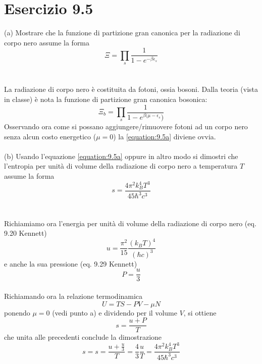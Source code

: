 \documentclass[a4paper]{article}
\begin{document}
    \section*{Esercizio 9.5}
        (a) Mostrare che la funzione di partizione gran canonica per la radiazione di corpo nero assume la forma
        \begin{equation}
            \Xi=\prod_s\frac{1}{1-e^{-\beta\epsilon_s}}
            \label{equation:9.5a}
        \end{equation}
        \\
        \\
        La radiazione di corpo nero è costituita da fotoni, ossia bosoni.
        Dalla teoria (vista in classe) è nota la funzione di partizione gran canonica bosonica:
        \begin{equation*}
            \Xi_b=\prod_s\frac{1}{1-e^{\beta(\mu-\epsilon_s})}
        \end{equation*}
        Osservando ora come si possano aggiungere/rimuovere fotoni ad un corpo nero senza alcun costo energetico ($\mu=0$) la \ref{equation:9.5a} diviene ovvia.
        \\
        \\
        (b) Usando l'equazione \ref{equation:9.5a} oppure in altro modo si dimostri che l'entropia per unità di volume della radiazione di corpo nero a temperatura $T$ assume la forma
        \begin{equation}
            s=\frac{4\pi^2k_B^4T^3}{45\hbar^3c^3}
        \end{equation}
        \\
        \\
        Richiamiamo ora l'energia per unità di volume della radiazione di corpo nero (eq. 9.20 Kennett)
        \begin{equation*}
            u=\frac{\pi^2}{15}\frac{(k_BT)^4}{(\hbar c)^3}
        \end{equation*}
        e anche la sua pressione (eq. 9.29 Kennett)
        \begin{equation*}
            P=\frac{u}{3}
        \end{equation*}
        \\
        Richiamando ora la relazione termodinamica
        \begin{equation}
            U=TS-PV-\mu N
        \end{equation}
        ponendo $\mu=0$ (vedi punto a) e dividendo per il volume $V$, si ottiene
        \begin{equation*}
            s=\frac{u+P}{T}
        \end{equation*}
        che unita alle precedenti conclude la dimostrazione
        \begin{equation*}
            s=s=\frac{u+\frac{u}{3}}{T}=\frac{4}{3}\frac{u}{T}=\frac{4\pi^2k_B^4T^3}{45\hbar^3c^3}
        \end{equation*}
\end{document}
